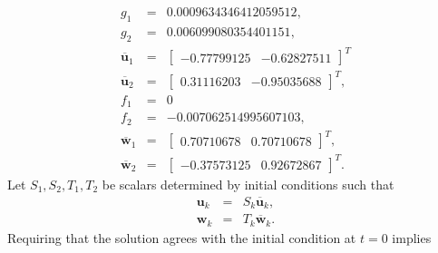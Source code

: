 \documentclass [12pt, a4paper] {article}
\newcommand{\vc}[1]
{
	\boldsymbol{#1}
}
\begin{document}
\begin {eqnarray}
    g_1 &=& 0.0009634346412059512, \\
    g_2 &=& 0.006099080354401151, \\
    \overline{\vc u}_1 &=&
    \begin {bmatrix}
        -0.77799125 & -0.62827511
    \end {bmatrix}^T
    \\
    \overline{\vc u}_2 &=& 
    \begin {bmatrix}
        0.31116203 & -0.95035688
    \end {bmatrix}^T,
    \\
    f_1 &=& 0 \\
    f_2 &=& -0.007062514995607103,
    \\
    \overline{\vc w}_1 &=&
    \begin {bmatrix}
       0.70710678 & 0.70710678 
    \end {bmatrix}^T,
    \\
    \overline{\vc w}_2 &=&
    \begin {bmatrix}
       -0.37573125 & 0.92672867 
    \end {bmatrix}^T.
\end {eqnarray}
Let $S_1, S_2, T_1, T_2$ be scalars determined by initial conditions such that
\begin {eqnarray}
    \vc u_k &=& S_k\overline{\vc u}_k, \\
    \vc w_k &=& T_k\overline{\vc w}_k.
\end {eqnarray}
Requiring that the solution agrees with the initial condition at $t=0$ implies 
\end{document}
